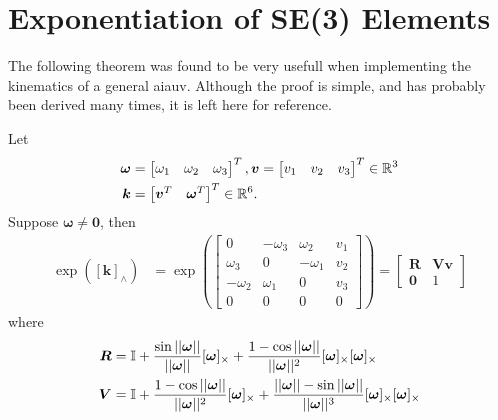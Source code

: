 \chapter{Exponentiation of SE(3) Elements}

The following theorem was found to be very usefull when implementing the kinematics
of a general \gls{aiauv}. Although the proof is simple, and has probably been
derived many times, it is left here for reference.

\begin{theorem}
Let
\begin{subequations}
\begin{align*}
\bm{\omega} &= \begin{bmatrix}\omega_1 & \omega_2 & \omega_3 \end{bmatrix}^T,
\bm{v} = \begin{bmatrix}v_1 & v_2 & v_3 \end{bmatrix}^T \in \mathbb{R}^3 \\
\bm{k} &= \begin{bmatrix}\bm{v}^T & \bm{\omega}^T\end{bmatrix}^T \in \mathbb{R}^6.
\end{align*}
\end{subequations}
Suppose \(\bm{\omega} \neq \bm{0}\), then
\begin{subequations}
\label{eq:app:math:proof1}
\begin{align}
    \exp{\left([\bm{k}]_{\wedge}\right)} &= 
    \exp{\left(\begin{bmatrix}
        0 & -\omega_3 & \omega_2 & v_1 \\
        \omega_3 & 0 & -\omega_1 & v_2 \\
        -\omega_2 & \omega_1 & 0 & v_3 \\
        0 & 0 & 0 & 0
    \end{bmatrix} \right)} = \begin{bmatrix}
        \bm{R} & \bm{V}\bm{v} \\
        \bm{0} & 1
    \end{bmatrix}
\end{align}
\end{subequations}
where
\begin{subequations}
\begin{align*}
    \bm{R} &= \mathbb{I}
    + \frac{\sin{||\bm{\omega}||}}{||\bm{\omega}||}[\bm{\omega}]_{\times}
    + \frac{1-\cos{||\bm{\omega}||}}{||\bm{\omega}||^2}
       [\bm{\omega}]_{\times}[\bm{\omega}]_{\times} \\
    \bm{V} &= \mathbb{I}
    + \frac{1-\cos||\bm{\omega}||}{||\bm{\omega}||^2}[\bm{\omega}]_{\times}
    + \frac{||\bm{\omega}||-\sin||\bm{\omega}||}{||\bm{\omega}||^3}[\bm{\omega}]_{\times}[\bm{\omega}]_{\times}
\end{align*}
\end{subequations}
\end{theorem}

